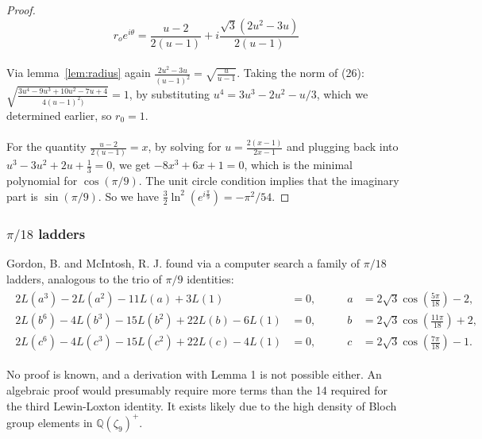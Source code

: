 \documentclass[12pt]{article}
\begin{document}
{\begin{proof}
\begin{equation}r_oe^{i\theta} =\frac{u - 2}{2 (u - 1)}   +i\frac{\sqrt{3} (2 u^2 - 3 u)}{2 (u - 1)}\end{equation}
\\
\noindent Via lemma~\ref{lem:radius} again $\frac{ 2 u^2 - 3 u}{ (u - 1)^2}=  \sqrt{\frac{u}{u - 1}}$. Taking the norm of (26): $\sqrt{\frac{3 u^4 - 9 u^3 + 10 u^2 - 7 u + 4}{4 (u - 1)^2)}}=1$, 
\noindent by substituting $u^4=3u^3-2u^2-u/3$, which we determined earlier, so $r_0=1$.  
\\
\\
\noindent For the quantity $\frac{u - 2}{2 (u - 1)}=x$, by solving for $u = \frac{2(x - 1)}{2 x - 1}$ and plugging back into $u^3 - 3u^2 + 2u + \frac{1}{3}=0$, we get $-8 x^3 + 6 x + 1=0$, which is the minimal polynomial for $\cos(\pi/9)$. The unit circle condition implies that the imaginary  part is  $\sin(\pi/9)$. So we have $ \frac{3}{2} \ln^2(e^{i\frac{\pi}{9}})= -\pi^2/54 $. \end{proof}
\noindent 

\subsubsection{$\pi/18$ ladders}

\noindent Gordon, B. and McIntosh, R. J. \cite{GordonMcIntosh1997} found via a computer search a family of $\pi/18$ ladders, analogous to the trio of $\pi/9$ identities:
\begin{align}
\begin{aligned}
2L(a^3) - 2L(a^2) - 11L(a) + 3L(1) &= 0, \\
2L(b^6) - 4L(b^3) - 15L(b^2) + 22L(b) - 6L(1) &= 0, \\
2L(c^6) - 4L(c^3) - 15L(c^2) + 22L(c) - 4L(1) &= 0,
\end{aligned}
\qquad
\begin{aligned}
a &= 2\sqrt{3}\cos\!\left(\tfrac{5\pi}{18}\right) - 2, \\
b &= 2\sqrt{3}\cos\!\left(\tfrac{11\pi}{18}\right) + 2, \\
c &= 2\sqrt{3}\cos\!\left(\tfrac{7\pi}{18}\right) - 1.
\end{aligned}
\end{align} 

\remark No proof is known, and a derivation with Lemma 1 is not possible either. An algebraic proof would presumably require  more terms than the 14 required for the third Lewin-Loxton identity. It  exists likely  due to  the high density of Bloch group elements in $\mathbb{Q}(\zeta_9)^+$.


}
\end{document}
